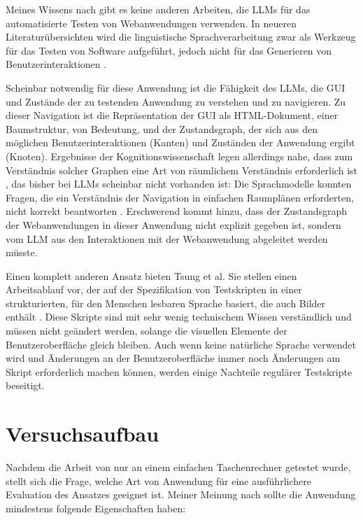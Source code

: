Meines Wissens nach gibt es keine anderen Arbeiten, die LLMs für das automatisierte Testen von Webanwendungen verwenden.
In neueren Literaturübersichten wird die linguistische Sprachverarbeitung zwar als Werkzeug für das Testen von Software aufgeführt, jedoch nicht für das Generieren von Benutzerinteraktionen \cite{implementation_verma_2023, machine_fontes_2021}.

Scheinbar notwendig für diese Anwendung ist die Fähigkeit des LLMs, die GUI und Zustände der zu testenden Anwendung zu verstehen und zu navigieren.
Zu dieser Navigation ist die Repräsentation der GUI als HTML-Dokument, einer Baumstruktur, von Bedeutung, und der Zustandsgraph, der sich aus den möglichen Benutzerinteraktionen (Kanten) und Zuständen der Anwendung ergibt (Knoten).
Ergebnisse der Kognitionswissenschaft legen allerdings nahe, dass zum Verständnis solcher Graphen eine Art von räumlichem Verständnis erforderlich ist \cite{what_is_a_cognitive_map}, das bisher bei LLMs scheinbar nicht vorhanden ist:
Die Sprachmodelle konnten Fragen, die ein Verständnis der Navigation in einfachen Raumplänen erforderten, nicht korrekt beantworten \cite{cogmaps_llm}.
Erschwerend kommt hinzu, dass der Zustandsgraph der Webanwendungen in dieser Anwendung nicht explizit gegeben ist, sondern vom LLM aus den Interaktionen mit der Webanwendung abgeleitet werden müsste.

Einen komplett anderen Ansatz bieten Tsung et al.
Sie stellen einen Arbeitsablauf vor, der auf der Spezifikation von Testskripten in einer strukturierten, für den Menschen lesbaren Sprache basiert, die auch Bilder enthält \cite{tsung}.
Diese Skripte sind mit sehr wenig technischem Wissen verständlich und müssen nicht geändert werden, solange die visuellen Elemente der Benutzeroberfläche gleich bleiben.
Auch wenn keine natürliche Sprache verwendet wird und Änderungen an der Benutzeroberfläche immer noch Änderungen am Skript erforderlich machen können, werden einige Nachteile regulärer Testskripte beseitigt.


\chapter{Versuchsaufbau}
\label{ch:ExperimentalSetup}

Nachdem die Arbeit von  nur an einem einfachen Taschenrechner getestet wurde, stellt sich die Frage, welche Art von Anwendung für eine ausführlichere Evaluation des Ansatzes geeignet ist.
Meiner Meinung nach sollte die Anwendung mindestens folgende Eigenschaften haben:

